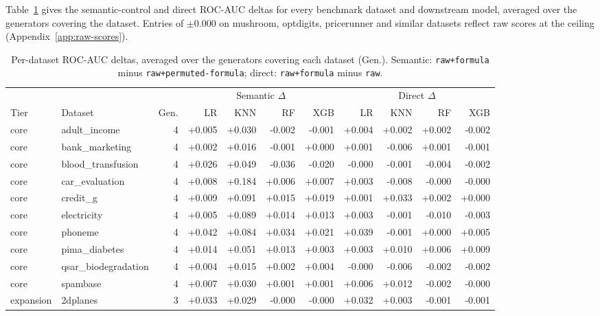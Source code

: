 Table~\ref{tab:per-dataset} gives the semantic-control and direct ROC-AUC deltas for every benchmark dataset and downstream model, averaged over the generators covering the dataset. Entries of \(\pm 0.000\) on mushroom, optdigits, pricerunner and similar datasets reflect raw scores at the ceiling (Appendix~\ref{app:raw-scores}).


\begin{table}[htbp]
\caption{Per-dataset ROC-AUC deltas, averaged over the generators covering each dataset (Gen.). Semantic: \texttt{raw+formula} minus \texttt{raw+permuted-formula}; direct: \texttt{raw+formula} minus \texttt{raw}.}\label{tab:per-dataset}
\centering
\scriptsize
\setlength{\tabcolsep}{3pt}
\begin{adjustbox}{max width=\linewidth}
\begin{tabular}{llrrrrrrrrr}
\toprule
& & & \multicolumn{4}{c}{Semantic $\Delta$} & \multicolumn{4}{c}{Direct $\Delta$} \\
\cmidrule(lr){4-7}\cmidrule(lr){8-11}
Tier & Dataset & Gen. & LR & KNN & RF & XGB & LR & KNN & RF & XGB \\
\midrule
core & adult\_income & 4 & +0.005 & +0.030 & -0.002 & -0.001 & +0.004 & +0.002 & +0.002 & -0.002 \\
core & bank\_marketing & 4 & +0.002 & +0.016 & -0.001 & +0.000 & +0.001 & -0.006 & +0.001 & -0.001 \\
core & blood\_transfusion & 4 & +0.026 & +0.049 & -0.036 & -0.020 & -0.000 & -0.001 & -0.004 & -0.002 \\
core & car\_evaluation & 4 & +0.008 & +0.184 & +0.006 & +0.007 & +0.003 & -0.008 & -0.000 & -0.000 \\
core & credit\_g & 4 & +0.009 & +0.091 & +0.015 & +0.019 & +0.001 & +0.033 & +0.002 & +0.000 \\
core & electricity & 4 & +0.005 & +0.089 & +0.014 & +0.013 & +0.003 & -0.001 & -0.010 & -0.003 \\
core & phoneme & 4 & +0.042 & +0.084 & +0.034 & +0.021 & +0.039 & -0.001 & +0.000 & +0.005 \\
core & pima\_diabetes & 4 & +0.014 & +0.051 & +0.013 & +0.003 & +0.003 & +0.010 & +0.006 & +0.009 \\
core & qsar\_biodegradation & 4 & +0.004 & +0.015 & +0.002 & +0.004 & -0.000 & -0.006 & -0.002 & -0.002 \\
core & spambase & 4 & +0.007 & +0.030 & +0.001 & +0.001 & +0.006 & +0.012 & -0.002 & -0.000 \\
\midrule
expansion & 2dplanes & 3 & +0.033 & +0.029 & -0.000 & -0.000 & +0.032 & +0.003 & -0.001 & -0.001 \\

\end{tabular}
\end{adjustbox}
\end{table}
